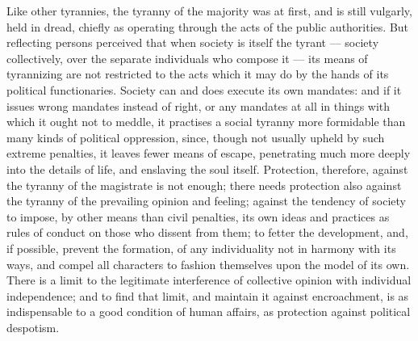 \documentclass[12pt]{report}
\begin{document}
Like other tyrannies, the tyranny of the majority was at first, and is still vulgarly, held in dread, chiefly as operating through the acts of the public authorities. But reflecting persons perceived that when society is itself the tyrant — society collectively, over the separate individuals who compose it — its means of tyrannizing are not restricted to the acts which it may do by the hands of its political functionaries. Society can and does execute its own mandates: and if it issues wrong mandates instead of right, or any mandates at all in things with which it ought not to meddle, it practises a social tyranny more formidable than many kinds of political oppression, since, though not usually upheld by such extreme penalties, it leaves fewer means of escape, penetrating much more deeply into the details of life, and enslaving the soul itself. Protection, therefore, against the tyranny of the magistrate is not enough; there needs protection also against the tyranny of the prevailing opinion and feeling; against the tendency of society to impose, by other means than civil penalties, its own ideas and practices as rules of conduct on those who dissent from them; to fetter the development, and, if possible, prevent the formation, of any individuality not in harmony with its ways, and compel all characters to fashion themselves upon the model of its own. There is a limit to the legitimate interference of collective opinion with individual independence; and to find that limit, and maintain it against encroachment, is as indispensable to a good condition of human affairs, as protection against political despotism.
\end{document}
